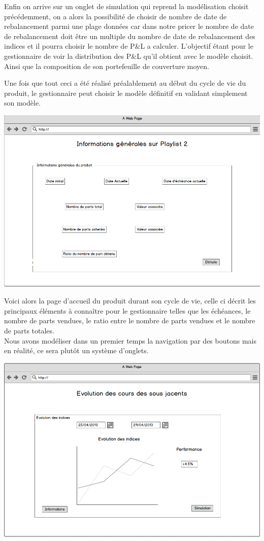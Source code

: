 \documentclass[french,12pt,a4paper]{article}
\begin{document}
Enfin on arrive sur un onglet de simulation qui reprend la modélisation choisit précédemment, on a alors la possibilité de choisir de nombre de date de rebalancement parmi une plage données car dans notre pricer le nombre de date de rebalancement  doit être un multiple du nombre de date de rebalancement des indices et il pourra choisir le nombre de P&L a calculer. L'objectif étant pour le gestionnaire de voir la distribution des P&L qu'il obtient avec le modèle choisit. Ainsi que la composition de son portefeuille de couverture moyen.

Une fois que tout ceci a été réalisé préalablement au début du cycle de vie du produit, le gestionnaire peut choisir le modèle définitif en validant simplement son modèle.


\begin{center}
\includegraphics[scale=0.4]{../Images/Maquette_1.png}
\end{center}


Voici alors la page d'accueil du produit durant son cycle de vie, celle ci décrit les principaux éléments à connaître pour le gestionnaire telles que les échéances, le nombre de parts vendues, le ratio entre le nombre de parts vendues et le nombre de parts totales. \\
Nous avons modéliser dans un premier temps la navigation par des boutons mais en réalité, ce sera plutôt un système d'onglets.


\begin{center}
\includegraphics[scale=0.4]{../Images/Maquette_2.png}
\end{center}
\end{document}
